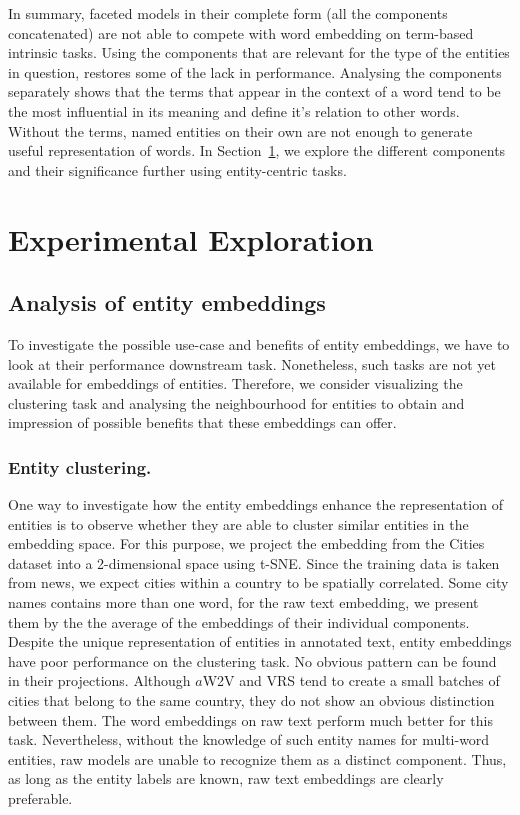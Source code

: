 In summary, faceted models in their complete form (all the components concatenated) are not able to compete with word embedding on term-based intrinsic tasks. Using the components that are relevant for the type of the entities in question, restores some of the lack in performance. Analysing the components separately shows that the terms that appear in the context of a word tend to be the most influential in its meaning and define it's relation to other words. Without the terms, named entities on their own are not enough to generate useful representation of words.  In Section~\ref{sec:eval_experimental}, we explore the different components and their significance further using entity-centric tasks. 

\section{Experimental Exploration}\label{sec:eval_experimental}

\subsection{Analysis of entity embeddings}\label{subsec:exp_entity}
To investigate the possible use-case and benefits of entity embeddings, we have to look at their performance downstream task. Nonetheless, such tasks are not yet available for embeddings of entities. Therefore, we consider visualizing the clustering task and analysing the neighbourhood for entities to obtain and impression of possible benefits that these embeddings can offer. 

\subsubsection{Entity clustering.} 
One way to investigate how the entity embeddings enhance the representation of entities is to observe whether they are able to cluster similar entities in the embedding space. For this purpose, we project the embedding from the Cities dataset into a 2-dimensional space using t-SNE. Since the training data is taken from news, we expect cities within a country to be spatially correlated. Some city names contains more than one word, for the raw text embedding, we present them by the the average of the embeddings of their individual components. Despite the unique representation of entities in annotated text, entity embeddings have poor performance on the clustering task. No obvious pattern can be found in their projections. Although $a$W2V and VRS tend to create a small batches of cities that belong to the same country, they do not show an obvious distinction between them. The word embeddings on raw text perform much better for this task. Nevertheless, without the knowledge of such entity names for multi-word entities, raw models are unable to recognize them as a distinct component. Thus, as long as the entity labels are known, raw text embeddings are clearly preferable. 

